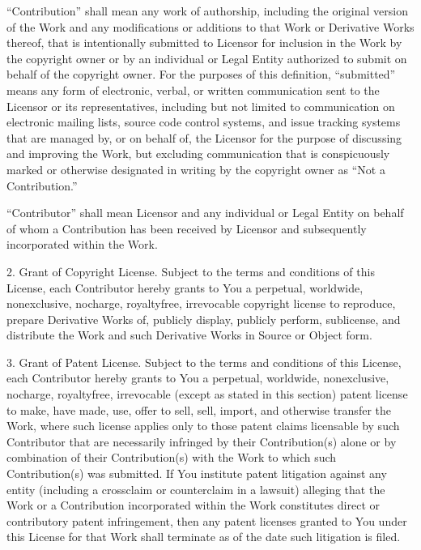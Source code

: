 \documentclass[letterpaper,10pt,english]{sphinxmanual}
\begin{document}
“Contribution” shall mean any work of authorship, including
the original version of the Work and any modifications or additions
to that Work or Derivative Works thereof, that is intentionally
submitted to Licensor for inclusion in the Work by the copyright owner
or by an individual or Legal Entity authorized to submit on behalf of
the copyright owner. For the purposes of this definition, “submitted”
means any form of electronic, verbal, or written communication sent
to the Licensor or its representatives, including but not limited to
communication on electronic mailing lists, source code control systems,
and issue tracking systems that are managed by, or on behalf of, the
Licensor for the purpose of discussing and improving the Work, but
excluding communication that is conspicuously marked or otherwise
designated in writing by the copyright owner as “Not a Contribution.”

“Contributor” shall mean Licensor and any individual or Legal Entity
on behalf of whom a Contribution has been received by Licensor and
subsequently incorporated within the Work.

2. Grant of Copyright License. Subject to the terms and conditions of
this License, each Contributor hereby grants to You a perpetual,
worldwide, non\sphinxhyphen{}exclusive, no\sphinxhyphen{}charge, royalty\sphinxhyphen{}free, irrevocable
copyright license to reproduce, prepare Derivative Works of,
publicly display, publicly perform, sublicense, and distribute the
Work and such Derivative Works in Source or Object form.

3. Grant of Patent License. Subject to the terms and conditions of
this License, each Contributor hereby grants to You a perpetual,
worldwide, non\sphinxhyphen{}exclusive, no\sphinxhyphen{}charge, royalty\sphinxhyphen{}free, irrevocable
(except as stated in this section) patent license to make, have made,
use, offer to sell, sell, import, and otherwise transfer the Work,
where such license applies only to those patent claims licensable
by such Contributor that are necessarily infringed by their
Contribution(s) alone or by combination of their Contribution(s)
with the Work to which such Contribution(s) was submitted. If You
institute patent litigation against any entity (including a
cross\sphinxhyphen{}claim or counterclaim in a lawsuit) alleging that the Work
or a Contribution incorporated within the Work constitutes direct
or contributory patent infringement, then any patent licenses
granted to You under this License for that Work shall terminate
as of the date such litigation is filed.
\end{document}
